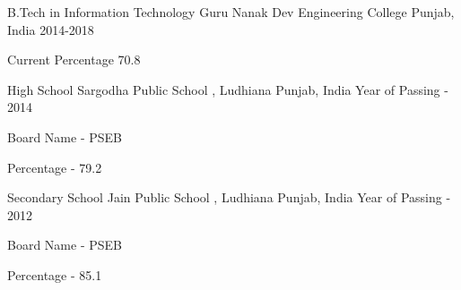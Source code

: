 


\begin{cventries}


\cventry
{B.Tech in Information Technology} %
{Guru Nanak Dev Engineering College} %
{Punjab, India} %
{2014-2018} %
{ %
\begin{cvitems}
\item {Current Percentage 70.8}
\end{cvitems}
}
 

\end{cventries}
\begin{cventries}


\cventry
{High School} %
{Sargodha Public School , Ludhiana} %
{Punjab, India} %
{Year of Passing - 2014} %
{ %
\begin{cvitems}
\item {Board Name - PSEB}
\item {Percentage - 79.2}
\end{cvitems}}
\end{cventries}
\begin{cventries}

\cventry
{Secondary School} %
{Jain Public School , Ludhiana} %
{Punjab, India} %
{Year of Passing - 2012} %
{ %
\begin{cvitems}
\item {Board Name - PSEB}
\item {Percentage - 85.1}
\end{cvitems}
}
 

\end{cventries}